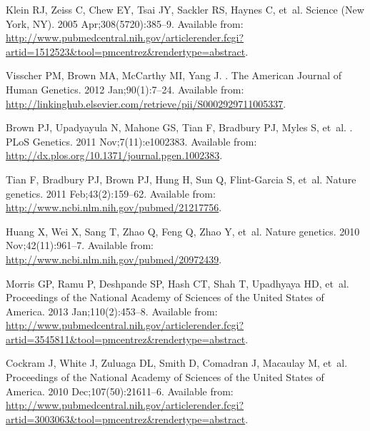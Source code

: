\documentclass[10pt,letterpaper]{article}
\begin{document}
\begin{thebibliography}{10}




Klein RJ, Zeiss C, Chew EY, Tsai JY, Sackler RS, Haynes C, et~al.
\newblock Science (New York, NY). 2005 Apr;308(5720):385--9.
\newblock Available from:
  \url{http://www.pubmedcentral.nih.gov/articlerender.fcgi?artid=1512523\&tool=pmcentrez\&rendertype=abstract}.

Visscher PM, Brown MA, McCarthy MI, Yang J.
.
\newblock The American Journal of Human Genetics. 2012 Jan;90(1):7--24.
\newblock Available from:
  \url{http://linkinghub.elsevier.com/retrieve/pii/S0002929711005337}.

Brown PJ, Upadyayula N, Mahone GS, Tian F, Bradbury PJ, Myles S, et~al.
.
\newblock PLoS Genetics. 2011 Nov;7(11):e1002383.
\newblock Available from:
  \url{http://dx.plos.org/10.1371/journal.pgen.1002383}.

Tian F, Bradbury PJ, Brown PJ, Hung H, Sun Q, Flint-Garcia S, et~al.
\newblock Nature genetics. 2011 Feb;43(2):159--62.
\newblock Available from: \url{http://www.ncbi.nlm.nih.gov/pubmed/21217756}.

Huang X, Wei X, Sang T, Zhao Q, Feng Q, Zhao Y, et~al.
\newblock Nature genetics. 2010 Nov;42(11):961--7.
\newblock Available from: \url{http://www.ncbi.nlm.nih.gov/pubmed/20972439}.

Morris GP, Ramu P, Deshpande SP, Hash CT, Shah T, Upadhyaya HD, et~al.
\newblock Proceedings of the National Academy of Sciences of the United States
  of America. 2013 Jan;110(2):453--8.
\newblock Available from:
  \url{http://www.pubmedcentral.nih.gov/articlerender.fcgi?artid=3545811\&tool=pmcentrez\&rendertype=abstract}.

Cockram J, White J, Zuluaga DL, Smith D, Comadran J, Macaulay M, et~al.
\newblock Proceedings of the National Academy of Sciences of the United States
  of America. 2010 Dec;107(50):21611--6.
\newblock Available from:
  \url{http://www.pubmedcentral.nih.gov/articlerender.fcgi?artid=3003063\&tool=pmcentrez\&rendertype=abstract}.


\end{thebibliography}
\end{document}
